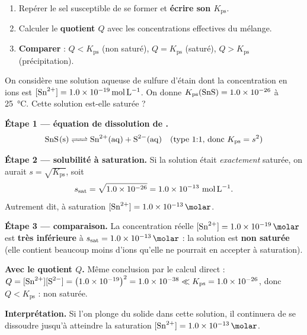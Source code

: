 \documentclass[11pt,a4paper]{article}
\newcommand{\Kps}{K_{\mathrm{ps}}}
\begin{document}
\begin{methode}
\begin{enumerate}[leftmargin=1.8em,topsep=2pt,itemsep=2pt]
  \item Repérer le sel susceptible de se former et \textbf{écrire son $\Kps$}.
  \item Calculer le \textbf{quotient $Q$} avec les concentrations effectives du mélange.
  \item \textbf{Comparer} : $Q<\Kps$ (non saturé), $Q=\Kps$ (saturé), $Q>\Kps$ (précipitation).
\end{enumerate}
\end{methode}

\begin{exemple}
On considère une solution aqueuse de sulfure d'étain  dont la concentration en ions
 est $[\ce{Sn^{2+}}]=\qty{1{,}0e-19}{\mole\per\litre}$. On donne
$\Kps(\ce{SnS})=\num{1{,}0e-26}$ à \qty{25}{\degreeCelsius}. Cette solution est-elle saturée ?

\smallskip
\textbf{Étape 1 — équation de dissolution de .}
\[ \ce{SnS(s) <=> Sn^{2+}(aq) + S^{2-}(aq)} \quad\text{(type $1{:}1$, donc $\Kps=s^{2}$)} \]

\textbf{Étape 2 — solubilité à saturation.} Si la solution était \emph{exactement} saturée, on aurait
$s=\sqrt{\Kps}$, soit
\[ s_{\text{sat}} = \sqrt{\num{1{,}0e-26}} = \num{1{,}0e-13}\ \si{\mole\per\litre}. \]
Autrement dit, à saturation $[\ce{Sn^{2+}}]=\qty{1{,}0e-13}{\molar}$.

\textbf{Étape 3 — comparaison.} La concentration réelle $[\ce{Sn^{2+}}]=\qty{1{,}0e-19}{\molar}$ est
\textbf{très inférieure} à $s_{\text{sat}}=\qty{1{,}0e-13}{\molar}$ : la solution est
\textbf{non saturée} (elle contient beaucoup moins d'ions qu'elle ne pourrait en accepter à
saturation).

\textbf{Avec le quotient $Q$.} Même conclusion par le calcul direct :
$Q=[\ce{Sn^{2+}}][\ce{S^{2-}}]=\bigl(\num{1{,}0e-19}\bigr)^{2}=\num{1{,}0e-38} \ll \Kps=\num{1{,}0e-26}$,
donc $Q<\Kps$ : non saturée.

\textbf{Interprétation.} Si l'on plonge du  solide dans cette solution, il continuera de se
dissoudre jusqu'à atteindre la saturation $[\ce{Sn^{2+}}]=\qty{1{,}0e-13}{\molar}$.
\end{exemple}
\end{document}
